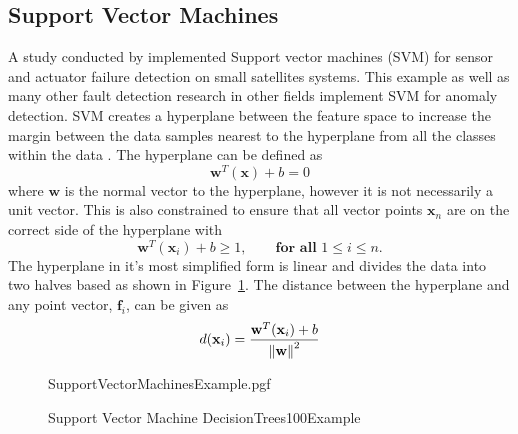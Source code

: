 \subsection{Support Vector Machines}
A study conducted by \cite{colagrossi2022fault} implemented Support vector machines (SVM) for sensor and actuator failure detection on small satellites systems. This example as well as many other fault detection research in other fields implement SVM for anomaly detection. SVM creates a hyperplane between the feature space to increase the margin between the data samples nearest to the hyperplane from all the classes within the data \cite{hearst1998support, meyer2015support}. The hyperplane can be defined as
\begin{equation}
\mathbf{w}^T(\mathbf{x}) + b = 0
\end{equation}
where $\mathbf{w}$ is the normal vector to the hyperplane, however it is not necessarily a unit vector. This is also constrained to ensure that all vector points $\mathbf{x}_n$ are on the correct side of the hyperplane with 
\begin{equation}
\mathbf{w}^T(\mathbf{x}_i) + b \geq 1, \qquad \textbf{for all }  1 \leq i \leq n.
\end{equation}
The hyperplane in it's most simplified form is linear and divides the data into two halves based as shown in Figure~\ref{fig:SupportVectorMachinesExample}. The distance between the hyperplane and any point vector, $\mathbf{f}_i$, can be given as
\begin{equation}
d(\mathbf{x}_i) = \frac{\mathbf{w}^T(\mathbf{x}_i) + b}{\left\lVert\mathbf{w}\right\rVert^2}
\end{equation}

\begin{figure}[!hbt]
	\centering
	{SupportVectorMachinesExample.pgf}
	\caption{Support Vector Machine DecisionTrees100Example}
	\label{fig:SupportVectorMachinesExample}
\end{figure}

